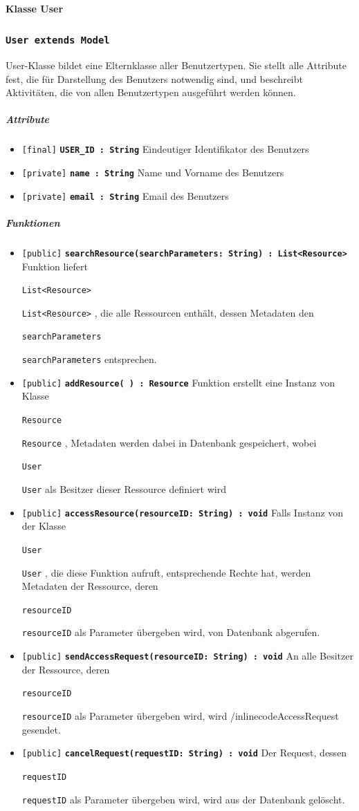 \documentclass[parskip=full,11pt]{scrartcl}
\makeatletter
\newcommand{\lstInline}[2][,]{%
	\begingroup%
	\lstset{#1}%
	\begin{lrbox}{\mylisting}\lstinline!#2!\end{lrbox}%
	\setlength{\@tempdima}{\linegoal}%
	\ifdim\wd\mylisting>\@tempdima\hfill\\\fi%
	\lstinline!#2!%
	\endgroup%
}
\newcommand{\class}[1]{\subsubsection*{\lstinline[basicstyle=\ttfamily\large]{#1}}}
\newcommand{\atr}[4]{\lstinline{[#3]} \textbf{\lstinline{#1 : #2}} \newline #4}
\newcommand{\mtd}[5]{\lstinline{[#4]} \textbf{\lstinline{#1(#3) : #2}} \newline #5}
\newcommand{\inlinecode}[1]{\lstInline[breaklines=true]{#1}}
\makeatother
\begin{document}
 \paragraph*{Klasse User}
 \class{User extends Model}
User-Klasse bildet eine Elternklasse aller Benutzertypen. Sie stellt alle Attribute fest, die für Darstellung des Benutzers notwendig sind, und beschreibt Aktivitäten, die von allen Benutzertypen ausgeführt werden können.
\subparagraph*{Attribute} %
\begin{itemize}
	\item \atr{USER_ID}{String}{final} {Eindeutiger Identifikator des Benutzers}
	\item \atr{name}{String}{private}{Name und Vorname des Benutzers}	
	\item \atr{email}{String}{private}{Email des Benutzers}
\end{itemize}

\subparagraph*{Funktionen}  %
\begin{itemize}
	\item \mtd{searchResource}{List<Resource>}{searchParameters: String} {public}{Funktion liefert  \inlinecode{List<Resource>}, die alle Ressourcen enthält, dessen Metadaten den \inlinecode{searchParameters} entsprechen.}
	
	\item \mtd{addResource}{Resource}{ }{public}{Funktion erstellt eine Instanz von Klasse \inlinecode{Resource}, Metadaten werden dabei in Datenbank gespeichert, wobei \inlinecode{User} als Besitzer dieser Ressource definiert wird}
	
	\item \mtd{accessResource}{void}{resourceID: String} {public}{Falls Instanz von der Klasse \inlinecode{User}, die diese Funktion aufruft, entsprechende Rechte hat, werden Metadaten der Ressource, deren \inlinecode{resourceID}} als Parameter übergeben wird, von Datenbank abgerufen.
	
	\item \mtd{sendAccessRequest}{void}{resourceID: String} {public}
	{An alle Besitzer der Ressource, deren \inlinecode{resourceID} als Parameter übergeben wird, wird /inlinecode{AccessRequest} gesendet.}
	
	\item \mtd{cancelRequest}{void}{requestID: String} {public}{Der Request, dessen \inlinecode{requestID}} als Parameter übergeben wird, wird aus der Datenbank gelöscht.
\end{itemize}
\end{document}
